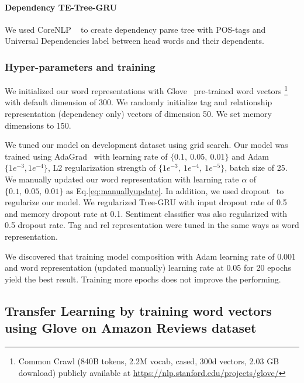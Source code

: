 \paragraph{Dependency TE-Tree-GRU}
We used CoreNLP ~\cite{manning2014stanford} to create dependency parse tree with POS-tags and  Universal Dependencies label between head words and their dependents.


\subsubsection{Hyper-parameters and training}
We initialized our word representations with Glove~\cite{glove} pre-trained word vectors \footnote{Common Crawl (840B tokens, 2.2M vocab, cased, 300d vectors, 2.03 GB download) publicly available at \url{https://nlp.stanford.edu/projects/glove/}}  with default dimension of 300.  We randomly initialize tag and relationship representation (dependency only) vectors of dimension 50. 
We set memory dimensions to 150.

We tuned our model on development dataset using grid search.
Our model was trained using AdaGrad~\cite{duchi2011adaptive} with learning rate of $\{0.1,~ 0.05,~ 0.01\}$ and Adam $\{1e^{-3}, 1e^{-4}\}$, L2 regularization strength of $\{1e^{-3},~ 1e^{-4}, ~ 1e^{-5} \}$, batch size of 25. 
We manually updated our word representation with learning rate $\alpha$ of $\{0.1,~0.05, ~0.01\}$ as Eq.\ref{eq:manuallyupdate}. 
In addition, we used dropout~\cite{krizhevsky2012imagenet} to regularize our model. 
We regularized Tree-GRU with input dropout rate of 0.5 and memory dropout rate at 0.1. 
Sentiment classifier was also regularized with 0.5 dropout rate. 
Tag and rel representation were tuned in the same ways as word representation.

We discovered that training model composition with Adam learning rate of 0.001 and word representation (updated manually) learning rate at 0.05 for 20 epochs yield the best result.
Training more epochs does not improve the performing.

\subsection{Transfer Learning by training word vectors using Glove on Amazon Reviews dataset}
